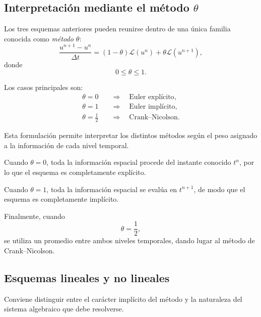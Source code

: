 \documentclass[12pt]{article}
\begin{document}
\subsection*{Interpretación mediante el método $\theta$}

Los tres esquemas anteriores pueden reunirse dentro de una única familia conocida como \emph{método $\theta$}:
\begin{equation}
    \frac{u^{n+1}-u^n}{\Delta t}
    =
    (1-\theta)\mathcal{L}(u^n)
    +
    \theta\mathcal{L}(u^{n+1}),
\end{equation}
donde
\begin{equation}
    0\leq\theta\leq1.
\end{equation}

Los casos principales son:
\begin{equation}
    \boxed{
    \begin{aligned}
        \theta=0
        &\quad\Longrightarrow\quad
        \text{Euler explícito},
        \\
        \theta=1
        &\quad\Longrightarrow\quad
        \text{Euler implícito},
        \\
        \theta=\frac12
        &\quad\Longrightarrow\quad
        \text{Crank--Nicolson}.
    \end{aligned}
    }
\end{equation}

Esta formulación permite interpretar los distintos métodos según el peso asignado a la información de cada nivel temporal.

Cuando $\theta=0$, toda la información espacial procede del instante conocido $t^n$, por lo que el esquema es completamente explícito.

Cuando $\theta=1$, toda la información espacial se evalúa en $t^{n+1}$, de modo que el esquema es completamente implícito.

Finalmente, cuando
\begin{equation}
    \theta=\frac12,
\end{equation}
se utiliza un promedio entre ambos niveles temporales, dando lugar al método de Crank--Nicolson.

\subsection*{Esquemas lineales y no lineales}

Conviene distinguir entre el carácter implícito del método y la naturaleza del sistema algebraico que debe resolverse.
\end{document}
